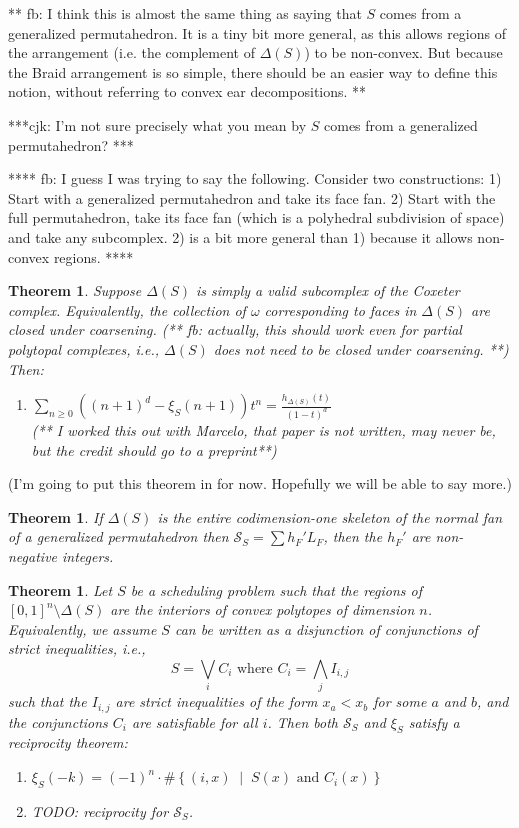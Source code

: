 \documentclass[12pt,reqno]{amsart}
\numberwithin{definition}{section}
\newtheorem{theorem}[definition]{Theorem}
\newcommand{\SSS}{\mathcal{S}}
\newcommand{\mset}[2]{ \left\{ #1 \; \middle| \; #2 \right\}}
\begin{document}
** fb: I think this is almost the same thing as saying that $S$ comes from a generalized permutahedron. It is a tiny bit more general, as this allows regions of the arrangement (i.e. the complement of $\Delta(S)$) to be non-convex. But because the Braid arrangement is so simple, there should be an easier way to define this notion, without referring to convex ear decompositions. **

***cjk: I'm not sure precisely what you mean by $S$ comes from a generalized permutahedron? ***

**** fb: I guess I was trying to say the following. Consider two constructions: 1) Start with a generalized permutahedron and take its face fan. 2) Start with the full permutahedron, take its face fan (which is a polyhedral subdivision of space) and take any subcomplex. 2) is a bit more general than 1) because it allows non-convex regions. ****

\begin{theorem}
Suppose $\Delta(S)$ is simply a valid subcomplex of the Coxeter complex.  Equivalently, the collection of $\omega$ 
corresponding to faces in $\Delta(S)$ are closed under coarsening. (** fb: actually, this should work even for partial polytopal complexes, i.e., $\Delta(S)$ does not need to be closed under coarsening. **) Then:
\begin{enumerate}
\item $ \sum_{n \geq 0} ((n+1)^d - \xi_S(n+1)) t^n = \frac{h_{\Delta(S)}(t)}{(1-t)^d} $ \\
(** I worked this out with Marcelo, that paper is not written, may never be, but the credit should go to a preprint**) 
\end{enumerate}
\end{theorem}

(I'm going to put this theorem in for now.  Hopefully we will be able to say more.)
\begin{theorem}
If $\Delta(S)$ is the entire codimension-one skeleton of the normal fan of a generalized permutahedron
then $\SSS_S = \sum h_F' L_F$, then the $h_F'$ are non-negative integers.
\end{theorem}

\begin{theorem}
Let $S$ be a scheduling problem such that the regions of $[0,1]^n\setminus\Delta(S)$ are the interiors of convex polytopes of dimension $n$. Equivalently, we assume $S$ can be written as a disjunction of conjunctions of strict inequalities, i.e.,
\[
  S = \bigvee_i C_i \text{ where } C_i = \bigwedge_j I_{i,j}
\] 
such that the $I_{i,j}$ are strict inequalities of the form $x_a < x_b$ for some $a$ and $b$, and the conjunctions $C_i$ are satisfiable for all $i$. Then both $\SSS_S$ and $\xi_S$ satisfy a reciprocity theorem:
\begin{enumerate}
\item $\xi_S(-k) = (-1)^n\cdot \#\mset{(i,x)}{S(x) \text{ and } C_i(x)}$
\item TODO: reciprocity for $\SSS_S$.
\end{enumerate}
\end{theorem}
\end{document}
